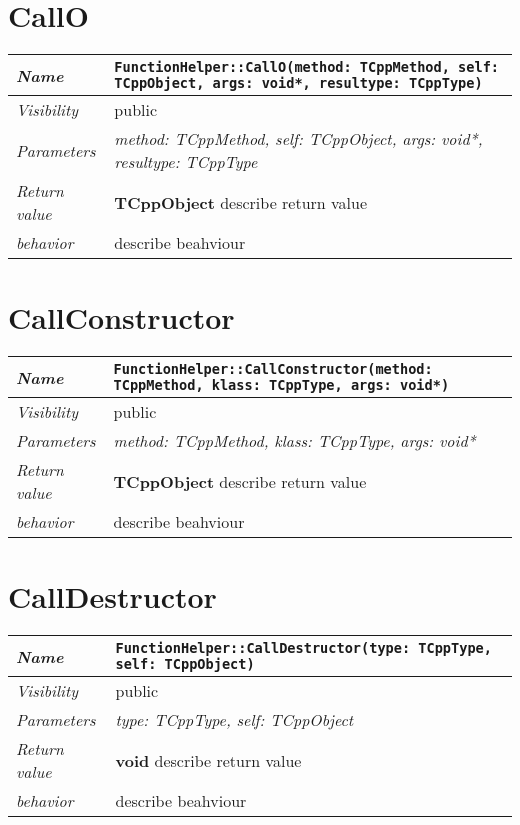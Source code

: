  \section{CallO}
\begin{longtable}{p{3cm} @{\hskip 1cm} p{12cm}}
 \hline
\textit{Name} & \texttt{FunctionHelper::CallO(method: TCppMethod, self: TCppObject, args: void*, resultype: TCppType)}\\
\hline
 \textit{Visibility} & public\\
\hline
\textit{Parameters} & \textit{method: TCppMethod, self: TCppObject, args: void*, resultype: TCppType}\\
\hline
\textit{Return value} & \textbf{ TCppObject} describe return value\\
  \hline
 \textit{behavior} & describe beahviour \\
\hline
\end{longtable} \pagebreak
 \section{CallConstructor}
\begin{longtable}{p{3cm} @{\hskip 1cm} p{12cm}}
 \hline
\textit{Name} & \texttt{FunctionHelper::CallConstructor(method: TCppMethod, klass: TCppType, args: void*)}\\
\hline
 \textit{Visibility} & public\\
\hline
\textit{Parameters} & \textit{method: TCppMethod, klass: TCppType, args: void*}\\
\hline
\textit{Return value} & \textbf{ TCppObject} describe return value\\
  \hline
 \textit{behavior} & describe beahviour \\
\hline
\end{longtable} \pagebreak
 \section{CallDestructor}
\begin{longtable}{p{3cm} @{\hskip 1cm} p{12cm}}
 \hline
\textit{Name} & \texttt{FunctionHelper::CallDestructor(type: TCppType, self: TCppObject)}\\
\hline
 \textit{Visibility} & public\\
\hline
\textit{Parameters} & \textit{type: TCppType, self: TCppObject}\\
\hline
\textit{Return value} & \textbf{ void} describe return value\\
  \hline
 \textit{behavior} & describe beahviour \\
\hline
\end{longtable} \pagebreak
